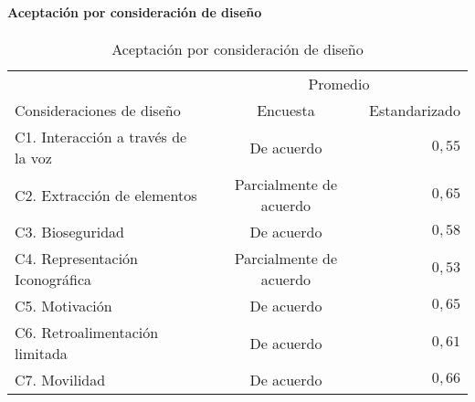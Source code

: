 \begin{frame}
\frametitle{\pagetitle}
\framesubtitle{Aceptación por consideración de diseño}

\begin{table}
\scriptsize
\centering
\begin{tabular}{lcr}
\toprule
& \multicolumn{2}{c}{Promedio} \\
\cmidrule(lr){2-3}
Consideraciones de diseño          & Encuesta                & Estandarizado \\
\midrule
C1. Interacción a través de la voz & De acuerdo              & $0,55$ \\
C2. Extracción de elementos        & Parcialmente de acuerdo & $0,65$ \\
C3. Bioseguridad                   & De acuerdo              & $0,58$ \\
C4. Representación Iconográfica    & Parcialmente de acuerdo & $0,53$ \\
C5. Motivación                     & De acuerdo              & $0,65$ \\
C6. Retroalimentación limitada     & De acuerdo              & $0,61$ \\
C7. Movilidad                      & De acuerdo              & $0,66$ \\
\bottomrule
\end{tabular}
\caption{Aceptación por consideración de diseño}
\end{table}

\end{frame}

